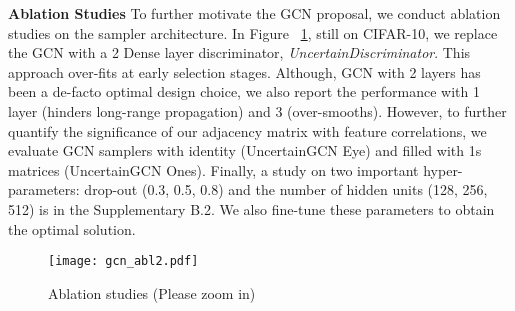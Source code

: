\noindent \textbf{Ablation Studies} To further motivate the GCN proposal, we conduct ablation studies on the sampler architecture. In Figure ~\ref{fig:abl_st}, still on CIFAR-10, we replace the GCN with a 2 Dense layer discriminator, \emph{UncertainDiscriminator}. This approach over-fits at early selection stages.
Although, GCN with 2 layers \cite{kipf2016semi} has been a de-facto optimal design choice,
we also report the performance with 1 layer (hinders long-range propagation) and 3 (over-smooths). However, to further quantify the significance of our adjacency matrix with feature correlations, we evaluate GCN samplers with identity (UncertainGCN Eye) and filled with 1s matrices (UncertainGCN Ones).
Finally, a study on 
two important hyper-parameters: drop-out (0.3, 0.5, 0.8) and the number of hidden units (128, 256, 512) is in the Supplementary B.2. 
We also fine-tune these parameters to obtain the optimal solution.



























\begin{figure}
    \centering
    \texttt{[image: gcn\_abl2.pdf]}
\caption{Ablation studies (Please zoom in)}
    \label{fig:abl_st}
\end{figure}


